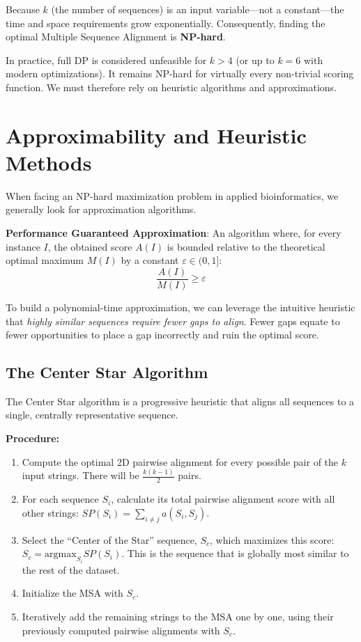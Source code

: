 \sta Because $k$ (the number of sequences) is an input variable—not a constant—the time and space requirements grow exponentially. Consequently, finding the optimal Multiple Sequence Alignment is \textbf{NP-hard}.

In practice, full DP is considered unfeasible for $k > 4$ (or up to $k=6$ with modern optimizations). It remains NP-hard for virtually every non-trivial scoring function. We must therefore rely on heuristic algorithms and approximations.

\section{Approximability and Heuristic Methods}

When facing an NP-hard maximization problem in applied bioinformatics, we generally look for approximation algorithms.

\begin{important}
    \textbf{Performance Guaranteed Approximation}: An algorithm where, for every instance $I$, the obtained score $A(I)$ is bounded relative to the theoretical optimal maximum $M(I)$ by a constant $\varepsilon \in (0, 1]$:
    \[
    \frac{A(I)}{M(I)} \ge \varepsilon
    \]
\end{important}

To build a polynomial-time approximation, we can leverage the intuitive heuristic that \textit{highly similar sequences require fewer gaps to align}. Fewer gaps equate to fewer opportunities to place a gap incorrectly and ruin the optimal score. 

\subsection{The Center Star Algorithm}

The Center Star algorithm is a progressive heuristic that aligns all sequences to a single, centrally representative sequence.

\textbf{Procedure:}
\begin{enumerate}
    \item Compute the optimal 2D pairwise alignment for every possible pair of the $k$ input strings. There will be $\frac{k(k-1)}{2}$ pairs.
    \item For each sequence $S_i$, calculate its total pairwise alignment score with all other strings: $SP(S_i) = \sum_{i \neq j} a(S_i, S_j)$.
    \item Select the ``Center of the Star'' sequence, $S_c$, which maximizes this score: $S_c = \text{argmax}_{S_i} SP(S_i)$. This is the sequence that is globally most similar to the rest of the dataset.
    \item Initialize the MSA with $S_c$.
    \item Iteratively add the remaining strings to the MSA one by one, using their previously computed pairwise alignments with $S_c$.
\end{enumerate}

